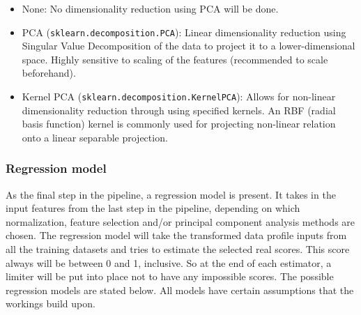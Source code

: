 \begin{itemize}
	\item None: No dimensionality reduction using PCA will be done.
	\item PCA (\verb|sklearn.decomposition.PCA|): Linear dimensionality reduction using Singular Value Decomposition of the data to project it to a lower-dimensional space. Highly sensitive to scaling of the features (recommended to scale beforehand).
	\item Kernel PCA (\verb|sklearn.decomposition.KernelPCA|): Allows for non-linear dimensionality reduction through using specified kernels. An RBF (radial basis function) kernel is commonly used for projecting non-linear relation onto a linear separable projection.
\end{itemize}

\subsubsection{Regression model}
As the final step in the pipeline, a regression model is present. It takes in the input features from the last step in the pipeline, depending on which normalization, feature selection and/or principal component analysis methods are chosen. The regression model will take the transformed data profile inputs from all the training datasets and tries to estimate the selected real scores. This score always will be between 0 and 1, inclusive. So at the end of each estimator, a limiter will be put into place not to have any impossible scores. The possible regression models are stated below. All models have certain assumptions that the workings build upon. 

